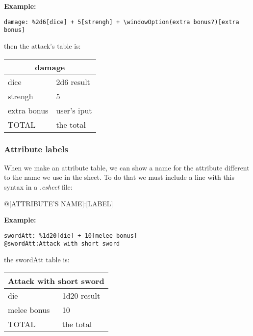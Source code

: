 \documentclass[11pt,a4paper,openright,oneside]{book}
\newenvironment{ex}
{
  \setlength{\parindent}{0cm}
  \large \textbf{Example:} \normalsize 
}
{}
\begin{document}
\begin{ex}
  \begin{lstlisting}
damage: %2d6[dice] + 5[strengh] + \windowOption(extra bonus?)[extra bonus]
  \end{lstlisting}
then the attack's table is:
\begin{table}[!ht]
\scriptsize
\begin{tabular}{|l|l|}
\hline
\multicolumn{2}{|c|}{\textsf{damage}} \\ \hline
 dice & 2d6 result  \\ \hline
 strengh & 5 \\ \hline
 extra bonus  & user's iput \\ \hline
 TOTAL & the total \\ \hline
\end{tabular}
\end{table}
\end{ex}

\subsubsection{Attribute labels}

When we make an attribute table, we can show a name for the attribute different to the name we use in the sheet. To do that we must include a line with this syntax in a \textit{.csheet} file:
\begin{center} \textsf{@\textsc{\scriptsize[ATTRIBUTE'S NAME]}:\textsc{\scriptsize[LABEL]}} \normalsize \end{center}

\begin{ex}
  \begin{lstlisting}
swordAtt: %1d20[die] + 10[melee bonus]
@swordAtt:Attack with short sword
  \end{lstlisting}
  the swordAtt table is:
\begin{table}[!ht]
\scriptsize
\begin{tabular}{|l|l|}
\hline
\multicolumn{2}{|c|}{\textsf{Attack with short sword}} \\ \hline
 die & 1d20 result  \\ \hline
 melee bonus & 10 \\ \hline
 TOTAL & the total \\ \hline
\end{tabular}
\end{table}

\end{ex}
\end{document}
